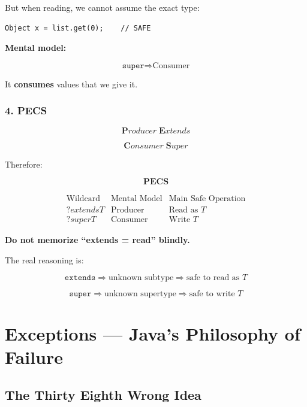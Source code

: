 \documentclass[11pt,a4paper]{book}
\begin{document}
But when reading, we cannot assume the exact type:

\begin{verbatim}
Object x = list.get(0);    // SAFE
\end{verbatim}

\textbf{Mental model:}

\[
\boxed{\texttt{super} \Rightarrow \text{Consumer}}
\]

It \textbf{consumes} values that we give it.


\subsection*{4. PECS}

\[
\boxed{
\textbf{P}roducer\;
\textbf{E}xtends
}
\]

\[
\boxed{
\textbf{C}onsumer\;
\textbf{S}uper
}
\]

Therefore:

\[
\boxed{\textbf{PECS}}
\]

\[
\begin{array}{c|c|c}
\text{Wildcard} & \text{Mental Model} & \text{Main Safe Operation}\\
\hline
? extends T & \text{Producer} & \text{Read as }T\\
? super T   & \text{Consumer} & \text{Write }T
\end{array}
\]

\textbf{Do not memorize ``extends = read'' blindly.}

The real reasoning is:

\[
\boxed{
\texttt{extends}
\Rightarrow
\text{unknown subtype}
\Rightarrow
\text{safe to read as }T
}
\]

\[
\boxed{
\texttt{super}
\Rightarrow
\text{unknown supertype}
\Rightarrow
\text{safe to write }T
}
\]

\chapter{Exceptions --- Java's Philosophy of Failure}

\section{The Thirty Eighth Wrong Idea}
\end{document}
